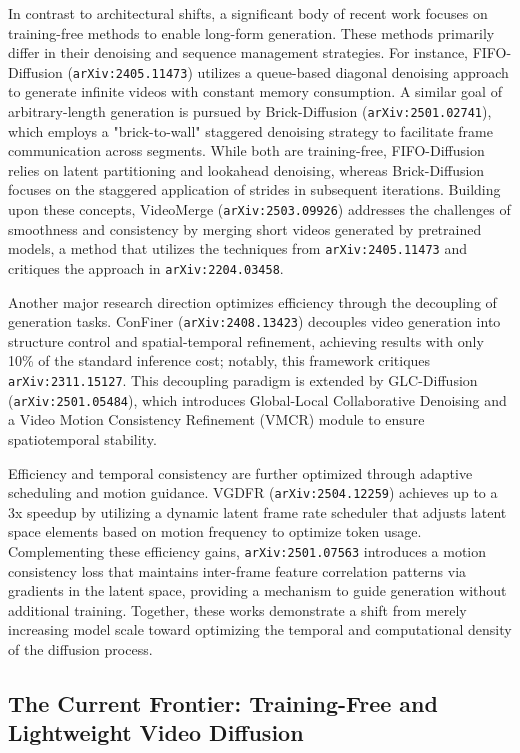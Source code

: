 \documentclass[11pt]{article}
\begin{document}
In contrast to architectural shifts, a significant body of recent work focuses on training-free methods to enable long-form generation. These methods primarily differ in their denoising and sequence management strategies. For instance, FIFO-Diffusion (\texttt{arXiv:2405.11473}) utilizes a queue-based diagonal denoising approach to generate infinite videos with constant memory consumption. A similar goal of arbitrary-length generation is pursued by Brick-Diffusion (\texttt{arXiv:2501.02741}), which employs a "brick-to-wall" staggered denoising strategy to facilitate frame communication across segments. While both are training-free, FIFO-Diffusion relies on latent partitioning and lookahead denoising, whereas Brick-Diffusion focuses on the staggered application of strides in subsequent iterations. Building upon these concepts, VideoMerge (\texttt{arXiv:2503.09926}) addresses the challenges of smoothness and consistency by merging short videos generated by pretrained models, a method that utilizes the techniques from \texttt{arXiv:2405.11473} and critiques the approach in \texttt{arXiv:2204.03458}.

Another major research direction optimizes efficiency through the decoupling of generation tasks. ConFiner (\texttt{arXiv:2408.13423}) decouples video generation into structure control and spatial-temporal refinement, achieving results with only 10\% of the standard inference cost; notably, this framework critiques \texttt{arXiv:2311.15127}. This decoupling paradigm is extended by GLC-Diffusion (\texttt{arXiv:2501.05484}), which introduces Global-Local Collaborative Denoising and a Video Motion Consistency Refinement (VMCR) module to ensure spatiotemporal stability.

Efficiency and temporal consistency are further optimized through adaptive scheduling and motion guidance. VGDFR (\texttt{arXiv:2504.12259}) achieves up to a 3x speedup by utilizing a dynamic latent frame rate scheduler that adjusts latent space elements based on motion frequency to optimize token usage. Complementing these efficiency gains, \texttt{arXiv:2501.07563} introduces a motion consistency loss that maintains inter-frame feature correlation patterns via gradients in the latent space, providing a mechanism to guide generation without additional training. Together, these works demonstrate a shift from merely increasing model scale toward optimizing the temporal and computational density of the diffusion process.

\subsection{The Current Frontier: Training-Free and Lightweight Video Diffusion}
\end{document}
